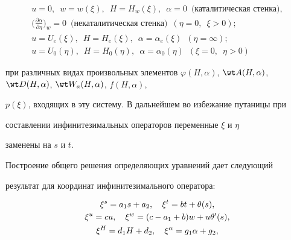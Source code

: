 \begin{gather*} 


u=0,\ \; w=w(\xi),\ \; H=H_w(\xi),\ \;\alpha=0\ \; 


\text{(каталитическая стенка)}, \\ 


% 


\bigg(\frac{\partial\alpha}{\partial\eta}\bigg)_w=0\ \; 


\text{(некаталитическая стенка)}\ \; (\eta=0,\ \;\xi>0);\\ 


% 


u=U_e(\xi),\ \; H=H_e(\xi),\ \; \alpha=\alpha_e(\xi) 


\ \; (\eta=\infty); \\ 


% 


u=U_0(\eta),\ \; H=H_0(\eta),\ \; 


\alpha=\alpha_0(\eta)\ \; (\xi=0,\ \; \eta>0) 


\end{gather*} 


при различных видах произвольных элементов $\varphi(H,\alpha)$, $\wt 


A(H,\alpha)$, $\wt D(H,\alpha)$, $\wt W_a(H,\alpha)$, $f(H,\alpha)$, 


$p(\xi)$, входящих в эту систему. В дальнейшем во избежание путаницы при 


составлении инфинитезимальных операторов переменные $\xi$ и $\eta$ 


заменены на $s$ и $t$. 


 


Построение общего решения определяющих уравнений дает следующий 


результат для координат инфинитезимального оператора:


\begin{gather} 


\xi^s=a_1s+a_2,\quad \xi^t=b t+\theta(s), \notag \\ 


% 


\xi^u=c u,\quad \xi^w=(c-a_1+b)w+u\theta'(s), \\ 


% 


\xi^H=d_1H+d_2,\quad \xi^\alpha=g_1\alpha+g_2,\notag 


\end{gather} 


